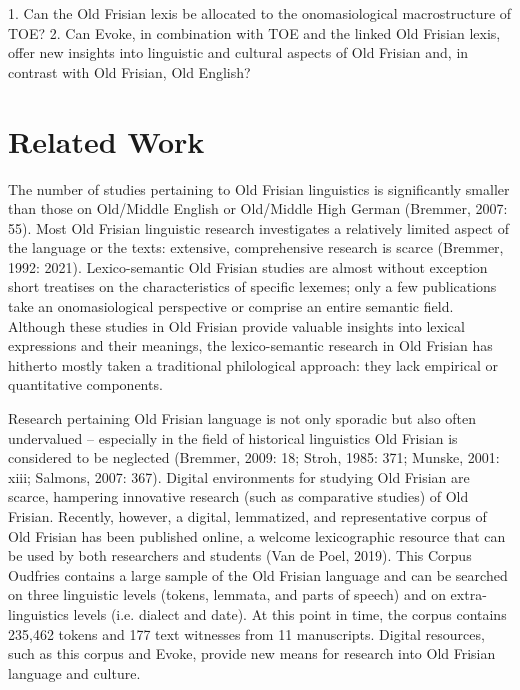 1.	Can the Old Frisian lexis be allocated to the onomasiological macrostructure of TOE?
2.	Can Evoke, in combination with TOE and the linked Old Frisian lexis, offer new insights into linguistic and cultural aspects of Old Frisian and, in contrast with Old Frisian, Old English?

\section{Related Work}
\label{sect:Stolk2021b:RelatedWork}

The number of studies pertaining to Old Frisian linguistics is significantly smaller than those on Old/Middle English or Old/Middle High German (Bremmer, 2007: 55). Most Old Frisian linguistic research investigates a relatively limited aspect of the language or the texts: extensive, comprehensive research is scarce (Bremmer, 1992: 2021). Lexico-semantic Old Frisian studies are almost without exception short treatises on the characteristics of specific lexemes; only a few publications take an onomasiological perspective or comprise an entire semantic field. Although these studies in Old Frisian provide valuable insights into lexical expressions and their meanings, the lexico-semantic research in Old Frisian has hitherto mostly taken a traditional philological approach: they lack empirical or quantitative components.

Research pertaining Old Frisian language is not only sporadic but also often undervalued – especially in the field of historical linguistics Old Frisian is considered to be neglected (Bremmer, 2009: 18; Stroh, 1985: 371; Munske, 2001: xiii; Salmons, 2007: 367). Digital environments for studying Old Frisian are scarce, hampering innovative research (such as comparative studies) of Old Frisian. Recently, however, a digital, lemmatized, and representative corpus of Old Frisian has been published online, a welcome lexicographic resource that can be used by both researchers and students (Van de Poel, 2019). This Corpus Oudfries contains a large sample of the Old Frisian language and can be searched on three linguistic levels (tokens, lemmata, and parts of speech) and on extra-linguistics levels (i.e. dialect and date). At this point in time, the corpus contains 235,462 tokens and 177 text witnesses from 11 manuscripts. Digital resources, such as this corpus and Evoke, provide new means for research into Old Frisian language and culture.

